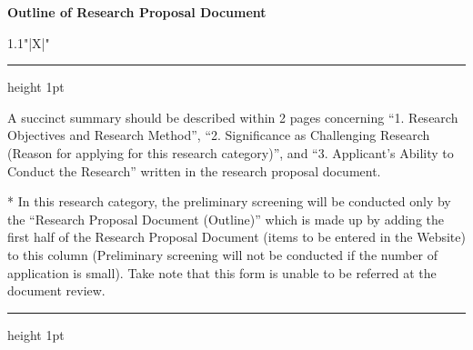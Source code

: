 \documentclass[8pt]{extarticle}
\makeatletter
\newcommand{\thickhline}{%
	\noalign {\ifnum 0=`}\fi \hrule height 1pt
	\futurelet \reserved@a \@xhline
}
\makeatother
\begin{document}
	
\noindent\textbf{\fontsize{12}{12}\selectfont Outline of Research Proposal Document}\\
\begin{tabularx}{1.1\linewidth}{"|X|"}
	\thickhline
	A succinct summary should be described within 2 pages concerning ``1. Research Objectives and Research Method'', ``2. Significance as Challenging Research (Reason for applying for this research category)'', and ``3. Applicant's Ability to Conduct the Research'' written in the research proposal document.
	
	* In this research category, the preliminary screening will be conducted only by the ``Research Proposal Document (Outline)'' which is made up by adding the first half of the Research Proposal Document (items to be entered in the Website) to this column (Preliminary screening will not be conducted if the number of application is small). Take note that this form is unable to be referred at the document review.
	\\
	\thickhline
\end{tabularx}
\end{document}
